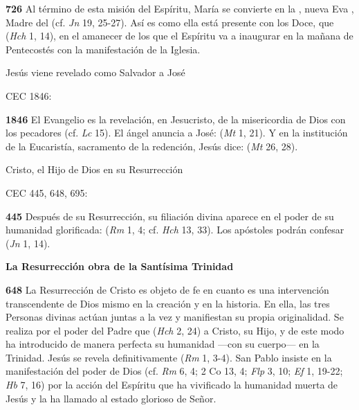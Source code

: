 \begin{body}
\begin{body}
\textbf{726} Al término de esta misión del Espíritu, María se convierte en la , nueva Eva , Madre del  (cf. \emph{Jn} 19, 25-27). Así es como ella está presente con los Doce, que  (\emph{Hch} 1, 14), en el amanecer de los  que el Espíritu va a inaugurar en la mañana de Pentecostés con la manifestación de la Iglesia.

Jesús viene revelado como Salvador a José

CEC 1846:

\textbf{1846} El Evangelio es la revelación, en Jesucristo, de la misericordia de Dios con los pecadores (cf. \emph{Lc} 15). El ángel anuncia a José:  (\emph{Mt} 1, 21). Y en la institución de la Eucaristía, sacramento de la redención, Jesús dice:  (\emph{Mt} 26, 28).

Cristo, el Hijo de Dios en su Resurrección

CEC 445, 648, 695:

\textbf{445} Después de su Resurrección, su filiación divina aparece en el poder de su humanidad glorificada:  (\emph{Rm} 1, 4; cf. \emph{Hch} 13, 33). Los apóstoles podrán confesar  (\emph{Jn} 1, 14).

\textbf{La Resurrección obra de la Santísima Trinidad}

\textbf{648} La Resurrección de Cristo es objeto de fe en cuanto es una intervención transcendente de Dios mismo en la creación y en la historia. En ella, las tres Personas divinas actúan juntas a la vez y manifiestan su propia originalidad. Se realiza por el poder del Padre que  (\emph{Hch} 2, 24) a Cristo, su Hijo, y de este modo ha introducido de manera perfecta su humanidad ---con su cuerpo--- en la Trinidad. Jesús se revela definitivamente  (\emph{Rm} 1, 3-4). San Pablo insiste en la manifestación del poder de Dios (cf. \emph{Rm} 6, 4; 2 Co 13, 4; \emph{Flp} 3, 10; \emph{Ef} 1, 19-22; \emph{Hb} 7, 16) por la acción del Espíritu que ha vivificado la humanidad muerta de Jesús y la ha llamado al estado glorioso de Señor.


\end{body}
\end{body}
